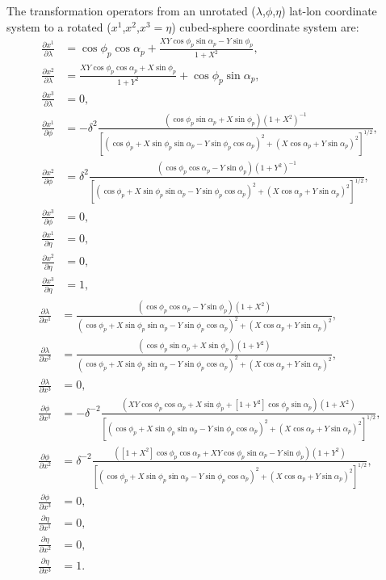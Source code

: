 \documentclass{article}
\begin{document}
The transformation operators from an unrotated ($\lambda$,$\phi$,$\eta$) lat-lon coordinate system to a rotated ($x^1$,$x^2$,$x^3=\eta$) cubed-sphere coordinate system are:
\begin{align}
\frac{\partial x^1}{\partial\lambda}&=\cos\phi_p\cos\alpha_p+\frac{XY\cos\phi_p\sin\alpha_p-Y\sin\phi_p }{1+X^2}, \\
\frac{\partial x^2}{\partial\lambda}&=\frac{XY\cos\phi_p\cos\alpha_p+X\sin\phi_p}{1+Y^2} + \cos\phi_p\sin\alpha_p, \\
\frac{\partial x^3}{\partial\lambda}&=0, \\
\frac{\partial x^1}{\partial\phi}&=-\delta^2\frac{( \cos\phi_p\sin\alpha_p +X\sin\phi_p) (1+X^2)^{-1}}{[(\cos\phi_p+X\sin\phi_p\sin\alpha_p-Y\sin\phi_p\cos\alpha_p)^2+(X\cos\alpha_p+Y\sin\alpha_p)^2]^{1/2}}, \\
\frac{\partial x^2}{\partial\phi}&=\delta^2\frac{( \cos\phi_p\cos\alpha_p  -Y\sin\phi_p ) (1+Y^2)^{-1}}{[(\cos\phi_p+X\sin\phi_p\sin\alpha_p-Y\sin\phi_p\cos\alpha_p)^2+(X\cos\alpha_p+Y\sin\alpha_p)^2]^{1/2}}, \\
\frac{\partial x^3}{\partial\phi}&=0, \\
\frac{\partial x^1}{\partial\eta}&=0, \\
\frac{\partial x^2}{\partial\eta}&=0, \\
\frac{\partial x^3}{\partial\eta}&=1,
\end{align}
\begin{align}
\frac{\partial\lambda}{\partial x^1}&=\frac{( \cos\phi_p\cos\alpha_p  -Y\sin\phi_p ) (1+X^2)}{(\cos\phi_p+X\sin\phi_p\sin\alpha_p-Y\sin\phi_p\cos\alpha_p)^2+(X\cos\alpha_p+Y\sin\alpha_p)^2}, \\
\frac{\partial\lambda}{\partial x^2}&=\frac{( \cos\phi_p\sin\alpha_p +X\sin\phi_p) (1+Y^2)}{(\cos\phi_p+X\sin\phi_p\sin\alpha_p-Y\sin\phi_p\cos\alpha_p)^2+(X\cos\alpha_p+Y\sin\alpha_p)^2}, \\
\frac{\partial\lambda}{\partial x^3}&=0, \\
\frac{\partial\phi}{\partial x^1}&=-\delta^{-2} \frac{(XY\cos\phi_p\cos\alpha_p+X\sin\phi_p+[1+Y^2]\cos\phi_p\sin\alpha_p)(1+X^2)}{[(\cos\phi_p+X\sin\phi_p\sin\alpha_p-Y\sin\phi_p\cos\alpha_p)^2+(X\cos\alpha_p+Y\sin\alpha_p)^2]^{1/2}}, \\
\frac{\partial\phi}{\partial x^2}&=\delta^{-2}\frac{([1+X^2]\cos\phi_p\cos\alpha_p+XY\cos\phi_p\sin\alpha_p-Y\sin\phi_p) (1+Y^2)}{[(\cos\phi_p+X\sin\phi_p\sin\alpha_p-Y\sin\phi_p\cos\alpha_p)^2+(X\cos\alpha_p+Y\sin\alpha_p)^2]^{1/2}}, \\
\frac{\partial\phi}{\partial x^3}&=0, \\
\frac{\partial\eta}{\partial x^1}&=0, \\
\frac{\partial\eta}{\partial x^2}&=0, \\
\frac{\partial\eta}{\partial x^3}&=1.
\end{align}
\end{document}
